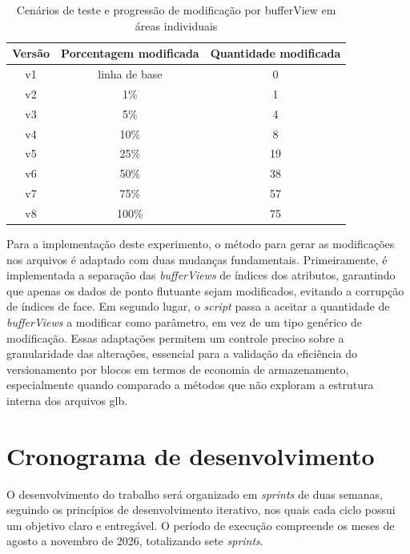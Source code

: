 \begin{table}[htb]
  \centering
  \caption{\label{tab:cenarios-exp2}Cenários de teste e progressão de modificação por bufferView em áreas individuais}
  \begin{tabular}{ccc}
    \toprule
    \textbf{Versão} & \textbf{Porcentagem modificada} & \textbf{Quantidade modificada} \\
    \midrule
    v1 & linha de base & 0  \\
    v2 & 1\%           & 1  \\
    v3 & 5\%           & 4  \\
    v4 & 10\%          & 8  \\
    v5 & 25\%          & 19 \\
    v6 & 50\%          & 38 \\
    v7 & 75\%          & 57 \\
    v8 & 100\%         & 75 \\
    \bottomrule
  \end{tabular}
\end{table}

Para a implementação deste experimento, o método para gerar as modificações nos
arquivos é adaptado com duas mudanças fundamentais. Primeiramente, é implementada a
separação das \textit{bufferViews} de índices dos atributos, garantindo que apenas
os dados de ponto flutuante sejam modificados, evitando a corrupção de índices de
face. Em segundo lugar, o \textit{script} passa a aceitar a quantidade de
\textit{bufferViews} a modificar como parâmetro, em vez de um tipo genérico de
modificação. Essas adaptações permitem um controle preciso sobre a granularidade das
alterações, essencial para a validação da eficiência do versionamento por blocos em
termos de economia de armazenamento, especialmente quando comparado a métodos que
não exploram a estrutura interna dos arquivos \gls{glb}.

\section{Cronograma de desenvolvimento}

O desenvolvimento do trabalho será organizado em \textit{sprints} de duas semanas,
seguindo os princípios de desenvolvimento iterativo, nos quais cada ciclo possui um
objetivo claro e entregável. O período de execução compreende os meses de agosto a
novembro de 2026, totalizando sete \textit{sprints}.

